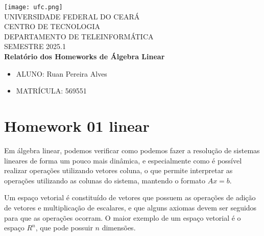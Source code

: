 


	
	\clearpage
	\thispagestyle{empty}
	
	\begin{bfseries}
		\begin{center}
			
			\texttt{[image: ufc.png]} \\
			\vspace{-4pt} 
			UNIVERSIDADE FEDERAL DO CEARÁ \\
			\vspace{4pt} 
			CENTRO DE TECNOLOGIA \\
			\vspace{4pt} 
			DEPARTAMENTO DE TELEINFORMÁTICA \\
			\vspace{4pt}
			\vspace{4pt}
			SEMESTRE 2025.1 \\
			
			
			\vspace*{\fill}
			\textbf{Relatório dos Homeworks de Álgebra Linear}
			\vspace*{\fill}
			
		\end{center}
		
		\begin{itemize}[leftmargin=*]
			\setlength{\itemsep}{0pt}
			\item[] ALUNO: Ruan Pereira Alves
			\item[] MATRÍCULA: 569551
		\end{itemize}
		
	\end{bfseries}
	\newpage
	
	\section{Homework 01 linear}
	
	Em álgebra linear, podemos verificar como podemos fazer a resolução de sistemas lineares de forma um pouco mais dinâmica, e especialmente como é possível realizar operações utilizando vetores coluna, o que permite interpretar as operações utilizando as colunas do sistema, mantendo o formato $Ax = b$. 
	
	Um espaço vetorial é constituído de vetores que possuem as operações de adição de vetores e multiplicação de escalares, e que alguns axiomas devem ser seguidos para que as operações ocorram. O maior exemplo de um espaço vetorial é o espaço $R^n$, que pode possuir $n$ dimensões.
	
